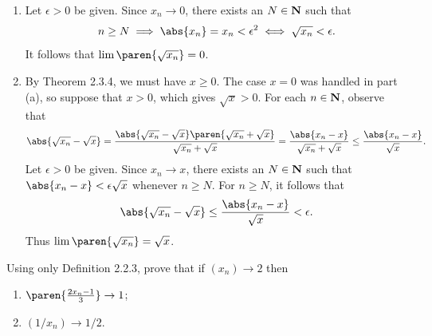 \documentclass{lew98_solutions}
\begin{document}
\begin{solution}
    \begin{enumerate}
        \item Let \( \epsilon > 0 \) be given. Since \( x_n \to 0 \), there exists an \( N \in \mathbf{N} \) such that
        \[
            n \geq N \implies \abs{x_n} = x_n < \epsilon^2 \iff \sqrt{x_n} < \epsilon.
        \]
        It follows that \( \lim \paren{\sqrt{x_n}} = 0 \).

        \item By Theorem 2.3.4, we must have \( x \geq 0 \). The case \( x = 0 \) was handled in part (a), so suppose that \( x > 0 \), which gives \( \sqrt{x} > 0 \). For each \( n \in \mathbf{N} \), observe that
        \[
            \abs{\sqrt{x_n} - \sqrt{x}} = \frac{\abs{\sqrt{x_n} - \sqrt{x}} \paren{ \sqrt{x_n} + \sqrt{x} }}{\sqrt{x_n} + \sqrt{x}} = \frac{\abs{x_n - x}}{\sqrt{x_n} + \sqrt{x}} \leq \frac{\abs{x_n - x}}{\sqrt{x}}.
        \]
        Let \( \epsilon > 0 \) be given. Since \( x_n \to x \), there exists an \( N \in \mathbf{N} \) such that \( \abs{x_n - x} < \epsilon \sqrt{x} \) whenever \( n \geq N \). For \( n \geq N \), it follows that
        \[
            \abs{\sqrt{x_n} - \sqrt{x}} \leq \frac{\abs{x_n - x}}{\sqrt{x}} < \epsilon.
        \]
        Thus \( \lim \paren{ \sqrt{x_n} } = \sqrt{x} \).
    \end{enumerate}
\end{solution}

\begin{exercise}
\label{ex:2.3.2}
    Using only Definition 2.2.3, prove that if \( (x_n) \to 2 \) then
    \begin{enumerate}
        \item \( \paren{ \frac{2 x_n - 1}{3} } \to 1 \);

        \item \( (1/x_n) \to 1/2 \).
    \end{enumerate}
\end{exercise}
\end{document}
